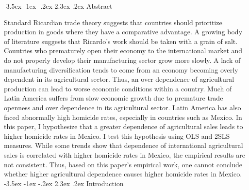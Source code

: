 \documentclass[12pt]{article}
\makeatletter
\renewcommand\section{\@startsection {section}{1}{\z@}%
                                       {-3.5ex \@plus -1ex \@minus -.2ex}%
                                       {2.3ex \@plus.2ex}%
                                       {\normalfont\fontfamily{phv}\fontsize{16}{19}\bfseries}}
\makeatother
\begin{document}
\section{Abstract} \label{s:intro}

Standard Ricardian trade theory suggests that countries should prioritize production in goods where they have a comparative advantage. A growing body of literature suggests that Ricardo's work should be taken with a grain of salt. Countries who prematurely open their economy to the international market and do not properly develop their manufacturing sector grow more slowly. A lack of manufacturing diversification tends to come from an economy becoming overly dependent in its agricultural sector. Thus, an over dependence of agricultural production can lead to worse economic conditions within a country. Much of Latin America suffers from slow economic growth due to premature trade openness and over dependence in its agricultural sector. Latin America has also faced abnormally high homicide rates, especially in countries such as Mexico. In this paper, I hypothesize that a greater dependence of agricultural sales leads to higher homicide rates in Mexico. I test this hypothesis using OLS and 2SLS measures. While some trends show that dependence of international agricultural sales is correlated with higher homicide rates in Mexico, the empirical results are not consistent. Thus, based on this paper's empirical work, one cannot conclude whether higher agricultural dependence causes higher homicide rates in Mexico.  
\newpage
\section{Introduction} \label{s:sec2}
\end{document}
